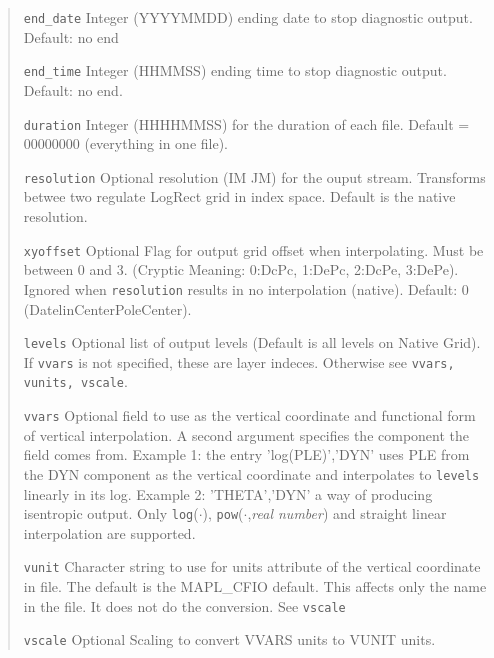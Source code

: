 \begin{quote}
\begin{trivlist}
 \item[\tt end\_date]     Integer (YYYYMMDD) ending date to stop diagnostic output.
                          Default: no end
 \item[\tt end\_time]     Integer (HHMMSS) ending time to stop diagnostic output.
                          Default: no end.
 \item[\tt duration]      Integer (HHHHMMSS) for the duration of each file. 
                          Default = 00000000 (everything in one file).
 \item[\tt resolution]    Optional resolution (IM JM) for the ouput stream.
                          Transforms betwee two regulate LogRect grid in index space. 
                          Default is the native resolution.
 \item[\tt xyoffset]      Optional Flag for output grid offset when interpolating. Must be
                          between 0 and 3. (Cryptic Meaning: 0:DcPc, 1:DePc, 2:DcPe, 3:DePe).
                          Ignored when {\tt resolution} results in no interpolation (native).
                          Default: 0 (DatelinCenterPoleCenter). 
 \item[\tt levels]        Optional list of output levels (Default is all levels on Native Grid).
                          If {\tt vvars} is not specified, these are layer indeces. Otherwise
                          see {\tt vvars, vunits, vscale}.
 \item[\tt vvars]         Optional field to use as the vertical coordinate and functional form
                          of vertical interpolation. A second argument specifies 
                          the component the field comes from. 
                          Example 1: the entry 'log(PLE)','DYN' uses PLE from the
                          DYN component as the vertical coordinate and interpolates
                          to {\tt levels} linearly in its log. Example 2: 'THETA','DYN'
                          a way of producing isentropic output.
                          Only {\tt log}($\cdot$), {\tt pow}($\cdot$,{\em real number})
                          and straight linear interpolation are supported.
 \item[\tt vunit]         Character string to use for units attribute of the vertical 
                          coordinate in file. 
                          The default is the MAPL\_CFIO default. 
                          This affects only the name in the file.
                          It does not do the conversion. See {\tt vscale}
 \item[\tt vscale]        Optional Scaling to convert VVARS units to VUNIT units.

\end{trivlist}
\end{quote}
